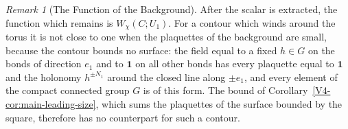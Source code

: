 \documentclass[11pt]{article}
\newcommand{\id}{\mathbf 1}
\numberwithin{equation}{section}
\theoremstyle{remark}
\newtheorem{remark}[theorem]{Remark}
\theoremstyle{plain}
\begin{document}
\begin{remark}[The Function of the Background]\label{rem:torus-background}
After the scalar is extracted, the function which remains is $W_{\chi}(C;U_1)$. For a contour which winds around the torus it is not close to one when the plaquettes of the background are small, because the contour bounds no surface: the field equal to a fixed $h\in G$ on the bonds of direction $e_1$ and to $\id$ on all other bonds has every plaquette equal to $\id$ and the holonomy $h^{\pm N_1}$ around the closed line along $\pm e_1$, and every element of the compact connected group $G$ is of this form. The bound of Corollary~\ref{V4-cor:main-leading-size}, which sums the plaquettes of the surface bounded by the square, therefore has no counterpart for such a contour.
\end{remark}
\end{document}
